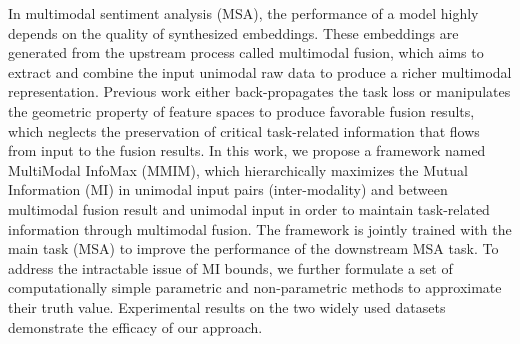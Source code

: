 In multimodal sentiment analysis (MSA), the performance of a model highly depends on the quality of synthesized embeddings. These embeddings are generated from the upstream process called multimodal fusion, which aims to extract and combine the input unimodal raw data to produce a richer multimodal representation. Previous work either back-propagates the task loss or manipulates the geometric property of feature spaces to produce favorable fusion results, which neglects the preservation of critical task-related information that flows from input to the fusion results. In this work, we propose a framework named MultiModal InfoMax (MMIM), which hierarchically maximizes the Mutual Information (MI) in unimodal input pairs (inter-modality) and between multimodal fusion result and unimodal input in order to maintain task-related information through multimodal fusion. The framework is jointly trained with the main task (MSA) to improve the performance of the downstream MSA task. To address the intractable issue of MI bounds, we further formulate a set of computationally simple parametric and non-parametric methods to approximate their truth value. Experimental results on the two widely used datasets demonstrate the efficacy of our approach.
